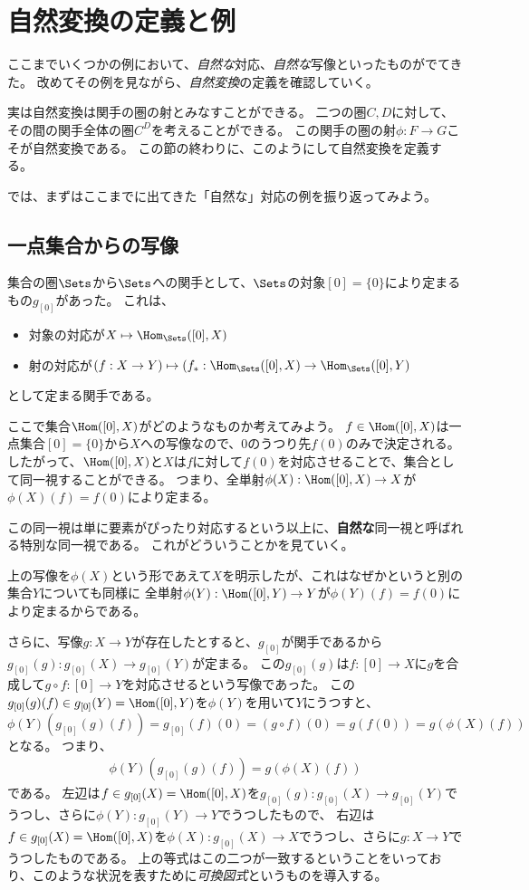 \documentclass[uplatex]{jsarticle}
\begin{document}
\section{自然変換の定義と例}
ここまでいくつかの例において、\emph{自然な}対応、\emph{自然な}写像といったものがでてきた。
改めてその例を見ながら、\emph{自然変換}の定義を確認していく。

実は自然変換は関手の圏の射とみなすことができる。
二つの圏$C, D$に対して、その間の関手全体の圏$C^D$を考えることができる。
この関手の圏の射$\phi:F\to G$こそが自然変換である。
この節の終わりに、このようにして自然変換を定義する。

では、まずはここまでに出てきた「自然な」対応の例を振り返ってみよう。

\subsection{一点集合からの写像}
集合の圏$\Sets$から$\Sets$への関手として、$\Sets$の対象$[0]=\{0\}$により定まるもの$g_{[0]}$があった。
これは、
\begin{itemize}
\item 対象の対応が$X \mapsto \Hom_{\Sets}([0], X)$
\item 射の対応が$(f:X \to Y) \mapsto (f_*:\Hom_{\Sets}([0],X) \to \Hom_{\Sets}([0],Y)$
\end{itemize}
として定まる関手である。

ここで集合$\Hom([0],X)$がどのようなものか考えてみよう。
$f\in\Hom([0],X)$は一点集合$[0]=\{0\}$から$X$への写像なので、$0$のうつり先$f(0)$のみで決定される。
したがって、$\Hom([0],X)$と$X$は$f$に対して$f(0)$を対応させることで、集合として同一視することができる。
つまり、全単射$\phi(X):\Hom([0],X) \to X$が$\phi(X)(f)=f(0)$により定まる。

この同一視は単に要素がぴったり対応するという以上に、\textbf{自然な}同一視と呼ばれる特別な同一視である。
これがどういうことかを見ていく。

上の写像を$\phi(X)$という形であえて$X$を明示したが、これはなぜかというと別の集合$Y$についても同様に
全単射$\phi(Y):\Hom([0],Y) \to Y$が$\phi(Y)(f)=f(0)$により定まるからである。

さらに、写像$g:X \to Y$が存在したとすると、$g_{[0]}$が関手であるから$g_{[0]}(g):g_{[0]}(X) \to g_{[0]}(Y)$が定まる。
この$g_{[0]}(g)$は$f:[0] \to X$に$g$を合成して$g\circ f:[0] \to Y$を対応させるという写像であった。
この$g_{[0]}(g)(f)\in g_{[0]}(Y)=\Hom([0],Y)$を$\phi(Y)$を用いて$Y$にうつすと、$\phi(Y)(g_{[0]}(g)(f))=g_{[0]}(f)(0)=(g\circ f)(0)=g(f(0))=g(\phi(X)(f))$となる。
つまり、
\begin{align*}
\phi(Y)(g_{[0]}(g)(f))=g(\phi(X)(f))
\end{align*}
である。
左辺は$f\in g_{[0]}(X)=\Hom([0],X)$を$g_{[0]}(g):g_{[0]}(X) \to g_{[0]}(Y)$でうつし、さらに$\phi(Y):g_{[0]}(Y) \to Y$でうつしたもので、
右辺は$f\in g_{[0]}(X)=\Hom([0],X)$を$\phi(X):g_{[0]}(X) \to X$でうつし、さらに$g:X \to Y$でうつしたものである。
上の等式はこの二つが一致するということをいっており、このような状況を表すために\emph{可換図式}というものを導入する。
\end{document}
